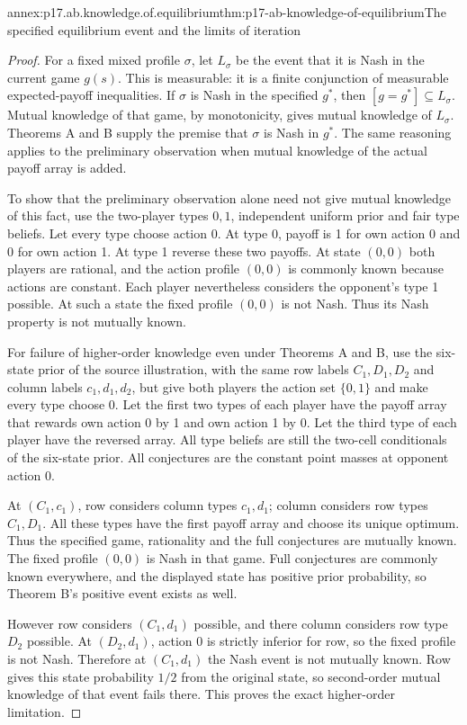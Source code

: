 \begin{annexitem}{annex:p17.ab.knowledge.of.equilibrium}{thm:p17-ab-knowledge-of-equilibrium}{The specified equilibrium event and the limits of iteration}
\begin{proof}
For a fixed mixed profile \(\sigma\), let \(L_\sigma\)
be the event that it is Nash in the current game \(g(s)\).
This is measurable: it is a finite conjunction of
measurable expected-payoff inequalities. If \(\sigma\)
is Nash in the specified \(g^*\), then
\([g=g^*]\subseteq L_\sigma\).
Mutual knowledge of that game, by monotonicity, gives
mutual knowledge of \(L_\sigma\). Theorems A and B supply
the premise that \(\sigma\) is Nash in \(g^*\).
The same reasoning applies to the preliminary observation
when mutual knowledge of the actual payoff array is added.

To show that the preliminary observation alone need not
give mutual knowledge of this fact, use the two-player
types \(0,1\), independent uniform prior and fair type
beliefs. Let every type choose action 0. At type 0,
payoff is 1 for own action 0 and 0 for own action 1.
At type 1 reverse these two payoffs. At state \((0,0)\)
both players are rational, and the action profile \((0,0)\)
is commonly known because actions are constant.
Each player nevertheless considers the opponent's type 1
possible. At such a state the fixed profile \((0,0)\)
is not Nash. Thus its Nash property is not mutually known.

For failure of higher-order knowledge even under Theorems
A and B, use the six-state prior of the source illustration,
with the same row labels \(C_1,D_1,D_2\) and column labels
\(c_1,d_1,d_2\), but give both players the action set
\(\{0,1\}\) and make every type choose 0.
Let the first two types of each player have the payoff
array that rewards own action 0 by 1 and own action 1 by 0.
Let the third type of each player have the reversed array.
All type beliefs are still the two-cell conditionals of
the six-state prior. All conjectures are the constant
point masses at opponent action 0.

At \((C_1,c_1)\), row considers column types \(c_1,d_1\);
column considers row types \(C_1,D_1\). All these types
have the first payoff array and choose its unique optimum.
Thus the specified game, rationality and the full conjectures
are mutually known. The fixed profile \((0,0)\) is Nash
in that game. Full conjectures are commonly known everywhere,
and the displayed state has positive prior probability,
so Theorem B's positive event exists as well.

However row considers \((C_1,d_1)\) possible, and there
column considers row type \(D_2\) possible. At
\((D_2,d_1)\), action 0 is strictly inferior for row,
so the fixed profile is not Nash. Therefore at
\((C_1,d_1)\) the Nash event is not mutually known.
Row gives this state probability \(1/2\) from the original
state, so second-order mutual knowledge of that event
fails there. This proves the exact higher-order limitation.
\end{proof}
\end{annexitem}
